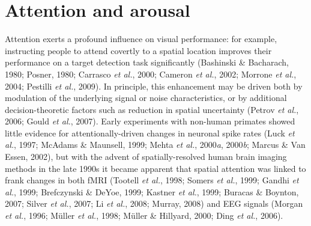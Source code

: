 \documentclass[
  letterpaper,
  DIV=11,
  numbers=noendperiod]{scrartcl}
\begin{document}
\section{Attention and arousal}\label{attention-and-arousal}

Attention exerts a profound influence on visual performance: for
example, instructing people to attend covertly to a spatial location
improves their performance on a target detection task significantly
(Bashinski \& Bacharach, 1980; Posner, 1980; Carrasco \emph{et al.},
2000; Cameron \emph{et al.}, 2002; Morrone \emph{et al.}, 2004; Pestilli
\emph{et al.}, 2009). In principle, this enhancement may be driven both
by modulation of the underlying signal or noise characteristics, or by
additional decision-theoretic factors such as reduction in spatial
uncertainty (Petrov \emph{et al.}, 2006; Gould \emph{et al.}, 2007).
Early experiments with non-human primates showed little evidence for
attentionally-driven changes in neuronal spike rates (Luck \emph{et
al.}, 1997; McAdams \& Maunsell, 1999; Mehta \emph{et al.},
2000\emph{a}, 2000\emph{b}; Marcus \& Van Essen, 2002), but with the
advent of spatially-resolved human brain imaging methods in the late
1990s it became apparent that spatial attention was linked to frank
changes in both fMRI (Tootell \emph{et al.}, 1998; Somers \emph{et al.},
1999; Gandhi \emph{et al.}, 1999; Brefczynski \& DeYoe, 1999; Kastner
\emph{et al.}, 1999; Buracas \& Boynton, 2007; Silver \emph{et al.},
2007; Li \emph{et al.}, 2008; Murray, 2008) and EEG signals (Morgan
\emph{et al.}, 1996; Müller \emph{et al.}, 1998; Müller \& Hillyard,
2000; Ding \emph{et al.}, 2006).
\end{document}
